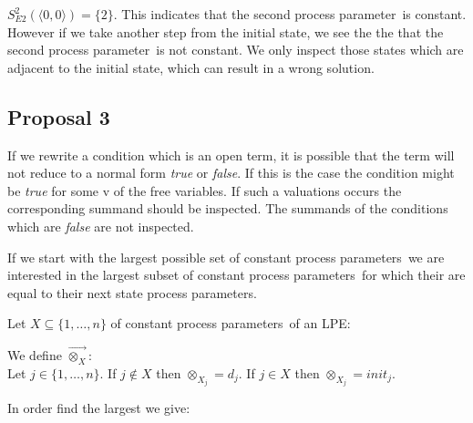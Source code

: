 \documentclass[a4paper,10pt]{article}
\theoremstyle{plain}
\theoremstyle{definition}
\newcommand{\ovr}{\overrightarrow}
\newcommand{\pp}{process parameter}
\newcommand{\pps}{process parameters}
\newcommand{\ti}{\textit}
\begin{document}
\begin{defn}
$S_{E2}^2(\langle 0,0 \rangle) = \lbrace 2 \rbrace$. This indicates that the second \pp\ is constant. However if we take another step from the initial state, we see the the that the second \pp\ is not constant. We only inspect those states which are adjacent to the initial state, which can result in a wrong solution.
\end{defn}

\subsection{Proposal 3}
If we rewrite a condition which is an open term, it is possible
that the term will not reduce to a normal form \ti{true} or \ti{false}. If this is the case the condition might be \ti{true} for some v of the free variables. If such a valuations occurs the corresponding summand should be inspected. The summands of the conditions which are \ti{false} are not inspected. 

If we start with the largest possible set of constant \pps\ we are interested in the largest subset of constant \pps\ for which their are equal to their next state \pps.

Let $X \subseteq \lbrace 1, \ldots, n \rbrace$ of constant \pps\ of an LPE:

\begin{defn} We define $\ovr{\otimes_X}$:\\
Let $j \in \lbrace 1, \dots, n \rbrace $. 
If $j \not\in X$ then $\otimes_{X_j} = d_j$. 
If $j \in X$ then $\otimes_{X_j} = init_j$.
\end{defn}

 
In order find the largest we give: %
\end{document}
